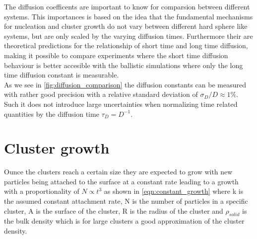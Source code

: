 The diffusion coefficents are important to know for comparsion between different systems. This importances is based on the idea that the fundamental mechanisms for nucleation and cluster growth do not vary between different hard sphere like systems, but are only scaled by the varying diffusion times. Furthermore their are theoretical predictions for the relationship of short time and long time diffusion, making it possible to compare experiments where the short time diffusion behaviour is better accesible with the ballistic simulations where only the long time diffusion constant is measurable.\\


As we see in \autoref{fig:diffusion_comparison} the diffusion constants can be measured with rather good precision with a relative standard deviation of $\sigma_D/D \approx 1\%$. Such it does not introduce large uncertainties when normalizing time related quantities by the diffusion time $\tau_{D} = D^{-1}$.

\section{Cluster growth}
\label{sec:Cluster growth}
Ounce the clusters reach a certain size they are expected to grow with new particles being attached to the surface at a constant rate leading to a growth with a proportionality of $N \propto t^3$ as shown in \autoref{eqn:constant_growth} where k is the assumed constant attachment rate, N is the number of particles in a specific cluster, A is the surface of the cluster, R is the radius of the cluster and $\rho_{solid}$ is the bulk density which is for large clusters a good approximation of the cluster density.\\

